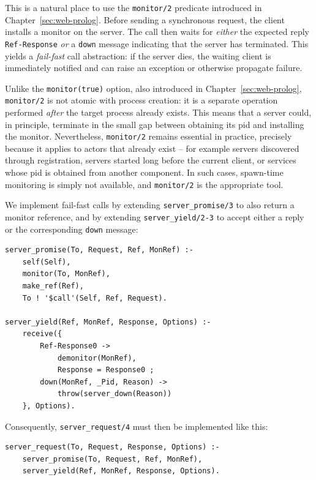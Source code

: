 This is a natural place to use the \texttt{monitor/2} predicate introduced in Chapter~\ref{sec:web-prolog}. Before sending a synchronous request, the client installs a monitor on the server. The call then waits for \emph{either} the expected reply \texttt{Ref-Response} \emph{or} a \texttt{down} message indicating that the server has terminated. This yields a \emph{fail-fast} call abstraction: if the server dies, the waiting client is immediately notified and can raise an exception or otherwise propagate failure.

Unlike the \texttt{monitor(true)} option, also introduced in Chapter~\ref{sec:web-prolog}, \texttt{monitor/2} is not atomic with process creation: it is a separate operation performed \emph{after} the target process already exists. This means that a server could, in principle, terminate in the small gap between obtaining its pid and installing the monitor. Nevertheless, \texttt{monitor/2} remains essential in practice, precisely because it applies to actors that already exist -- for example servers discovered through registration, servers started long before the current client, or services whose pid is obtained from another component. In such cases, spawn-time monitoring is simply not available, and \texttt{monitor/2} is the appropriate tool.

We implement fail-fast calls by extending \texttt{server\_promise/3} to also return a monitor reference, and by extending \texttt{server\_yield/2-3} to accept either a reply or the corresponding \texttt{down} message:

\begin{verbatim}
server_promise(To, Request, Ref, MonRef) :-
    self(Self),
    monitor(To, MonRef),
    make_ref(Ref),
    To ! '$call'(Self, Ref, Request).

server_yield(Ref, MonRef, Response, Options) :-
    receive({
        Ref-Response0 ->
            demonitor(MonRef),
            Response = Response0 ;
        down(MonRef, _Pid, Reason) ->
            throw(server_down(Reason))
    }, Options).
\end{verbatim}

\noindent Consequently, \texttt{server\_request/4} must then be implemented like this:

\begin{verbatim}
server_request(To, Request, Response, Options) :-
    server_promise(To, Request, Ref, MonRef),
    server_yield(Ref, MonRef, Response, Options).
\end{verbatim}

